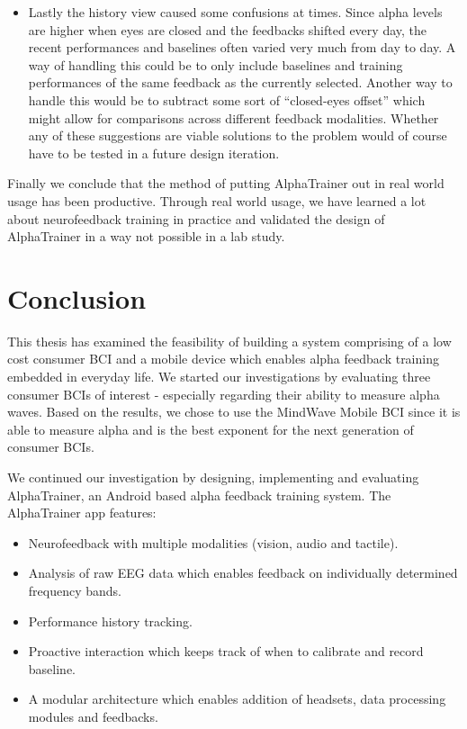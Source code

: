 \documentclass[a4paper,10pt,english,lof,lot,twoside]{puthesis}
\begin{document}
\begin{itemize}
\item {} 
Lastly the history view caused some confusions at times. Since alpha levels are higher when eyes are closed and the feedbacks shifted every day, the recent performances and baselines often varied very much from day to day. A way of handling this could be to only include baselines and training performances of the same feedback as the currently selected. Another way to handle this would be to subtract some sort of ``closed-eyes offset'' which might allow for comparisons across different feedback modalities. Whether any of these suggestions are viable solutions to the problem would of course have to be tested in a future design iteration.

\end{itemize}

Finally we conclude that the method of putting AlphaTrainer out in real world usage has been productive. Through real world usage, we have learned a lot about neurofeedback training in practice and validated the design of AlphaTrainer in a way not possible in a lab study.


\chapter{Conclusion}
\label{ch-conclusion/index:ch-conclusion}\label{ch-conclusion/index::doc}\label{ch-conclusion/index:conclusion}
This thesis has examined the feasibility of building a system comprising of a low cost consumer BCI and a mobile device which enables alpha feedback training embedded in everyday life. We started our investigations by evaluating three consumer BCIs of interest - especially regarding their ability to measure alpha waves. Based on the results, we chose to use the MindWave Mobile BCI since it is able to measure alpha and is the best exponent for the next generation of consumer BCIs.

We continued our investigation by designing, implementing and evaluating AlphaTrainer, an Android based alpha feedback training system. The AlphaTrainer app features:
\begin{itemize}
\item {} 
Neurofeedback with multiple modalities (vision, audio and tactile).

\item {} 
Analysis of raw EEG data which enables feedback on individually determined frequency bands.

\item {} 
Performance history tracking.

\item {} 
Proactive interaction which keeps track of when to calibrate and record baseline.

\item {} 
A modular architecture which enables addition of headsets, data processing modules and feedbacks.

\end{itemize}
\end{document}

